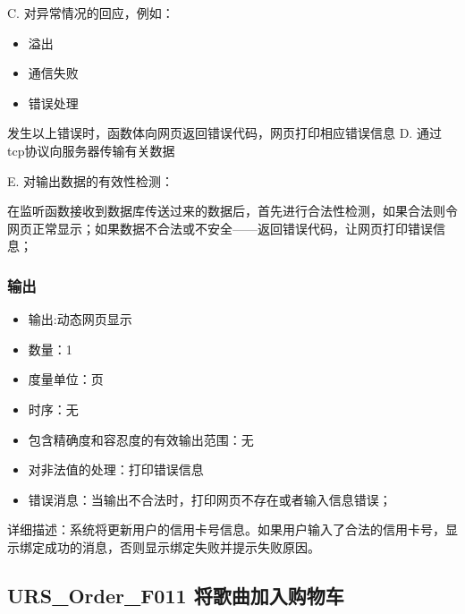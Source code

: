 			   
			   C. 对异常情况的回应，例如：
			   \begin{adjustwidth}{2cm}{1cm}\qquad
				   \begin{itemize}
					   \item 溢出
					   \item 通信失败
					   \item 错误处理
				   \end{itemize}		
			   \end{adjustwidth}
			   
				   发生以上错误时，函数体向网页返回错误代码，网页打印相应错误信息
			   D. 通过tcp协议向服务器传输有关数据
					   
			   E. 对输出数据的有效性检测：
			   
			   在监听函数接收到数据库传送过来的数据后，首先进行合法性检测，如果合法则令网页正常显示；如果数据不合法或不安全——返回错误代码，让网页打印错误信息；
			   
			   \subsubsection{输出}
			   \begin{itemize}
				   \item	输出:动态网页显示
				   \item	数量：1
				   \item	度量单位：页
				   \item	时序：无
				   \item	包含精确度和容忍度的有效输出范围：无
				   \item	对非法值的处理：打印错误信息
				   \item	错误消息：当输出不合法时，打印网页不存在或者输入信息错误；
				  \end{itemize}
				  详细描述：系统将更新用户的信用卡号信息。如果用户输入了合法的信用卡号，显示绑定成功的消息，否则显示绑定失败并提示失败原因。
		 

\subsection{URS\_Order\_F011 将歌曲加入购物车}

